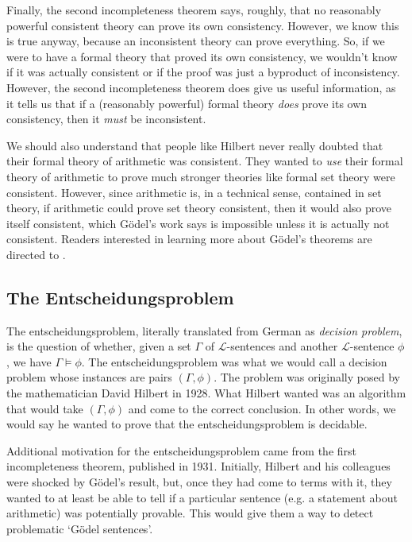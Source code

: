 \documentclass{article}
\theoremstyle{plain}
\theoremstyle{definition}
\begin{document}
Finally, the second incompleteness theorem says, roughly, that no reasonably powerful consistent theory can prove its own consistency. However, we know this is true anyway, because an inconsistent theory can prove everything. So, if we were to have a formal theory that proved its own consistency, we wouldn't know if it was actually consistent or if the proof was just a byproduct of inconsistency. However, the second incompleteness theorem does give us useful information, as it tells us that if a (reasonably powerful) formal theory \emph{does} prove its own consistency, then it \emph{must} be inconsistent. 

We should also understand that people like Hilbert never really doubted that their formal theory of arithmetic was consistent. They wanted to \emph{use} their formal theory of arithmetic to prove much stronger theories like formal set theory were consistent. However, since arithmetic is, in a technical sense, contained in set theory, if arithmetic could prove set theory consistent, then it would also prove itself consistent, which G\"odel's work says is impossible unless it is actually not consistent. Readers interested in learning more about G\"odel's theorems are directed to \cite{SmithGod}.    


\subsection{The Entscheidungsproblem}
The entscheidungsproblem, literally translated from German as \emph{decision problem}, is the question of whether, given a set $\Gamma$ of $\mathscr{L}$-sentences and another $\mathscr{L}$-sentence $\phi$ , we have $\Gamma\models \phi$. The entscheidungsproblem was what we would call a decision problem whose instances are pairs $(\Gamma,\phi)$. The problem was originally posed by the mathematician David Hilbert in 1928. What Hilbert wanted was an algorithm that would take $(\Gamma,\phi)$ and come to the correct conclusion. In other words, we would say he wanted to prove that the entscheidungsproblem is decidable.

Additional motivation for the entscheidungsproblem came from the first incompleteness theorem, published in 1931. Initially, Hilbert and his colleagues were shocked by G\"odel's result, but, once they had come to terms with it, they wanted to at least be able to tell if a particular sentence (e.g. a statement about arithmetic) was potentially provable. This would give them a way to detect problematic `G\"odel sentences'.   
\end{document}
